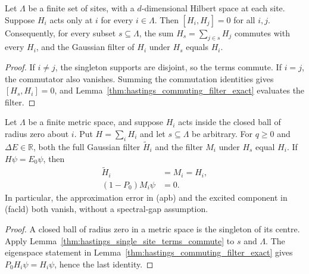 \begin{lemma}
    \label{thm:hastings_single_site_terms_commute}
    \leanok
    Let $\Lambda$ be a finite set of sites, with a $d$-dimensional Hilbert
    space at each site. Suppose $H_i$ acts only at $i$ for every $i\in\Lambda$.
    Then $[H_i,H_j]=0$ for all $i,j$. Consequently, for every subset
    $s\subseteq\Lambda$, the sum $H_s=\sum_{j\in s}H_j$ commutes with every
    $H_i$, and the Gaussian filter of $H_i$ under $H_s$ equals $H_i$.
\end{lemma}
\begin{proof}\leanok
    If $i\ne j$, the singleton supports are disjoint, so the terms commute.
    If $i=j$, the commutator also vanishes. Summing the commutation
    identities gives $[H_s,H_i]=0$, and
    Lemma~\ref{thm:hastings_commuting_filter_exact} evaluates the filter.
\end{proof}

\begin{lemma}
    \label{thm:hastings_zero_range_exact}
    \leanok
    Let $\Lambda$ be a finite metric space, and suppose $H_i$ acts inside
    the closed ball of radius zero about $i$. Put $H=\sum_iH_i$ and let
    $s\subseteq\Lambda$ be arbitrary. For $q\ge0$ and $\Delta E\in\mathbb R$,
    both the full Gaussian filter $\widetilde H_i$ and the filter $M_i$
    under $H_s$ equal $H_i$. If $H\psi=E_0\psi$, then
    \begin{align*}
        \widetilde H_i & =M_i=H_i, \\
        (1-P_0)M_i\psi & =0.
    \end{align*}
    In particular, the approximation error in (apb) and the excited
    component in (facld) both vanish, without a spectral-gap assumption.
\end{lemma}
\begin{proof}\leanok
    A closed ball of radius zero in a metric space is the singleton of its
    centre. Apply Lemma~\ref{thm:hastings_single_site_terms_commute} to
    $s$ and $\Lambda$. The eigenspace statement in
    Lemma~\ref{thm:hastings_commuting_filter_exact} gives
    $P_0H_i\psi=H_i\psi$, hence the last identity.
\end{proof}


